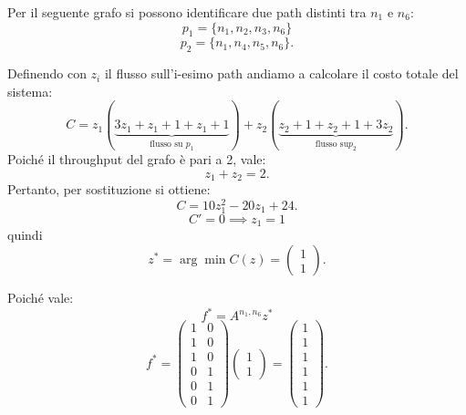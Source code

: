 \begin{alphaparts}

    \questionpart

    Per il seguente grafo si possono identificare due path distinti tra \(n_1\) e \(n_6\):
    \[p_1 = \{n_1, n_2, n_3, n_6\}\]
    \[p_2 = \{n_1, n_4, n_5, n_6\}.\]

    Definendo con \(z_i\) il flusso sull'i-esimo path andiamo a calcolare il costo totale del sistema:
    \[C = z_1(\underbrace{3z_1+ z_1+ 1+ z_1+ 1}_{ \text{flusso su }p_1})+ z_2(\underbrace{z_2+ 1 +z_2+ 1 + 3z_2}_{ \text{flusso su} p_2}).\]
    Poiché il throughput del grafo è pari a 2, vale:
    \[z_1+ z_2 = 2.\]
    Pertanto, per sostituzione si ottiene:
    \[C = 10z_1^2 - 20z_1 + 24. \]
    \[C' = 0 \implies z_1 = 1\]
    quindi
    \[z^* = \arg\min C(z) = \begin{pmatrix}
        1\\
        1
    \end{pmatrix}.  \]

    Poiché vale:
    \[ f^* = A^{n_1,n_6}z^*\]
    \[ f^* = \begin{pmatrix}
        1 & 0 \\
        1 & 0 \\
        1 & 0 \\
        0 & 1 \\
        0 & 1 \\
        0 & 1 
    \end{pmatrix} \begin{pmatrix} 1 \\ 1 \end{pmatrix}
     = \begin{pmatrix}
        1 \\ 1 \\ 1 \\ 1 \\ 1 \\ 1
    \end{pmatrix}. \]


    \questionpart
    


\end{alphaparts}